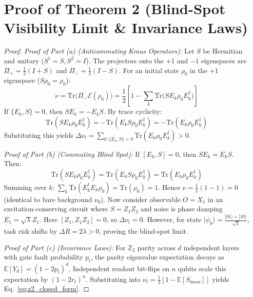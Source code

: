 \documentclass[aps,pra,twocolumn,superscriptaddress,10pt,floatfix]{revtex4-2}
\begin{document}
\section{Proof of Theorem 2 (Blind-Spot Visibility Limit \& Invariance Laws)}
\label{app:proof_thm2}
\begin{proof}
\textit{Proof of Part (a) (Anticommuting Kraus Operators):}
Let $S$ be Hermitian and unitary ($S^\dagger = S, S^2 = I$). The projectors onto the $+1$ and $-1$ eigenspaces are $\Pi_+ = \frac{1}{2}(I + S)$ and $\Pi_- = \frac{1}{2}(I - S)$.
For an initial state $\rho_0$ in the $+1$ eigenspace ($S \rho_0 = \rho_0$):
\begin{equation}
\nu = \mathrm{Tr}\big( \Pi_- \mathcal{E}(\rho_0) \big) = \frac{1}{2} \left[ 1 - \sum_k \mathrm{Tr}\big( S E_k \rho_0 E_k^\dagger \big) \right]
\end{equation}
If $\{E_k, S\} = 0$, then $S E_k = -E_k S$. By trace cyclicity:
\begin{equation}
\mathrm{Tr}(S E_k \rho_0 E_k^\dagger) = -\mathrm{Tr}(E_k S \rho_0 E_k^\dagger) = -\mathrm{Tr}(E_k \rho_0 E_k^\dagger)
\end{equation}
Substituting this yields $\Delta \nu_t = \sum_{k: \{E_k, S\}=0} \mathrm{Tr}(E_k \rho_0 E_k^\dagger) > 0$.

\textit{Proof of Part (b) (Commuting Blind Spot):}
If $[E_k, S] = 0$, then $S E_k = E_k S$. Then:
\begin{equation}
\mathrm{Tr}(S E_k \rho_0 E_k^\dagger) = \mathrm{Tr}(E_k S \rho_0 E_k^\dagger) = \mathrm{Tr}(E_k \rho_0 E_k^\dagger)
\end{equation}
Summing over $k$: $\sum_k \mathrm{Tr}(E_k^\dagger E_k \rho_0) = \mathrm{Tr}(\rho_0) = 1$. Hence $\nu = \frac{1}{2}(1 - 1) = 0$ (identical to bare background $\nu_0$).
Now consider observable $O = X_1$ in an excitation-conserving circuit where $S = Z_1 Z_2$ and noise is phase damping $E_1 = \sqrt{\lambda} Z_1$. Here $[Z_1, Z_1 Z_2] = 0$, so $\Delta \nu_t = 0$. However, for state $|\psi_0\rangle = \frac{|01\rangle + |10\rangle}{\sqrt{2}}$, task risk shifts by $\Delta R = 2\lambda > 0$, proving the blind-spot limit.

\textit{Proof of Part (c) (Invariance Laws):}
For $\mathbb{Z}_2$ parity across $d$ independent layers with gate fault probability $p_t$, the parity eigenvalue expectation decays as $\mathbb{E}[Y_d] = (1 - 2p_t)^d$. Independent readout bit-flips on $n$ qubits scale this expectation by $(1 - 2r_t)^n$. Substituting into $\nu_t = \frac{1}{2}[1 - \mathbb{E}[S_{\mathrm{meas}}]]$ yields Eq.~\ref{eq:z2_closed_form}.


\end{proof}
\end{document}
